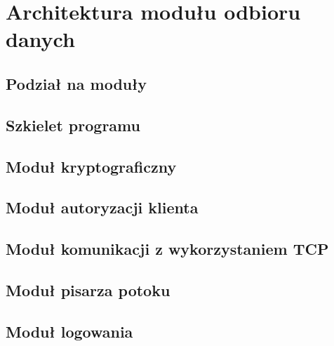 \chapter{Architektura modułu odbioru danych}
\label{chap:ArchDaemona}

\section[Podział na moduły][Podział na moduły]{Podział na moduły}

\section[Szkielet programu][Szkielet programu]{Szkielet programu}

\section[Moduł kryptograficzny][Moduł kryptograficzny]{Moduł kryptograficzny}

\section[Moduł autoryzacyjny][Moduł autoryzacji klienta]{Moduł autoryzacji klienta}

\section[Moduł TCP][Moduł komunikacji z wykorzystaniem TCP]{Moduł komunikacji z wykorzystaniem TCP}

\section[Moduł pisarza potoku][Moduł pisarza potoku]{Moduł pisarza potoku}

\section[Moduł logowania][Moduł logowania]{Moduł logowania}
